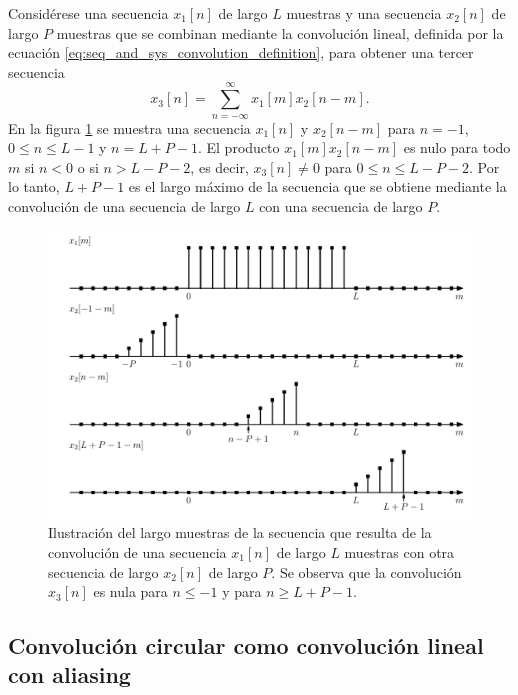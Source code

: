 \documentclass[a4paper]{report}
\begin{document}
Considérese una secuencia \(x_1[n]\) de largo \(L\) muestras y una secuencia \(x_2[n]\) de largo \(P\) muestras que se combinan mediante la convolución lineal, definida por la ecuación \ref{eq:seq_and_sys_convolution_definition}, para obtener una tercer secuencia
\begin{equation}\label{eq:dft_linear_convolution_definition}
 x_3[n]=\sum_{n=-\infty}^\infty x_1[m]x_2[n-m]. 
\end{equation}
En la figura \ref{fig:dft_linear_convolution_support} se muestra una secuencia \(x_1[n]\) y \(x_2[n-m]\) para \(n=-1\), \(0\leq n\leq L-1\) y \(n=L+P-1\). El producto \(x_1[m]x_2[n-m]\) es nulo para todo \(m\) si \(n<0\) o si \(n>L-P-2\), es decir, \(x_3[n]\neq0\) para \(0\leq n\leq L-P-2\). Por lo tanto, \(L+P-1\) es el largo máximo de la secuencia que se obtiene mediante la convolución de una secuencia de largo \(L\) con una secuencia de largo \(P\).
\begin{figure}[!htb]
 \begin{center}
 \includegraphics[width=1\textwidth]{figuras/dft_linear_convolution_support.pdf}
 \caption{\label{fig:dft_linear_convolution_support} Ilustración del largo muestras de la secuencia que resulta de la convolución de una secuencia \(x_1[n]\) de largo \(L\) muestras con otra secuencia de largo \(x_2[n]\) de largo \(P\). Se observa que la convolución \(x_3[n]\) es nula para \(n\leq-1\) y para \(n\geq L+P-1\).}
 \end{center}
\end{figure}

\subsection{Convolución circular como convolución lineal con aliasing}\label{sec:dft_circular_convolution_as_linear_with_aliasing}
\end{document}
